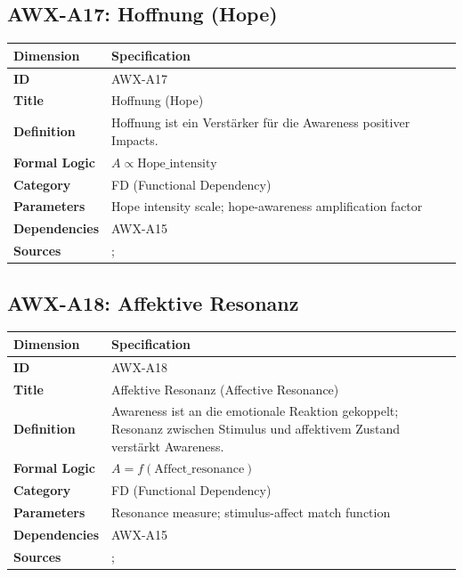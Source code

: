 
\subsection{AWX-A17: Hoffnung (Hope)}

\begin{table}[htbp]
\small
\begin{tabular}{p{3cm}p{11cm}}
\toprule
\textbf{Dimension} & \textbf{Specification} \\
\midrule
\textbf{ID} & AWX-A17 \\
\textbf{Title} & Hoffnung (Hope) \\
\textbf{Definition} & Hoffnung ist ein Verstärker für die Awareness positiver Impacts. \\
\textbf{Formal Logic} & $A \propto \text{Hope\_intensity}$ \\
\textbf{Category} & FD (Functional Dependency) \\
\textbf{Parameters} & Hope intensity scale; hope-awareness amplification factor \\
\textbf{Dependencies} & AWX-A15 \\
\textbf{Sources} & \citet{snyder2002hope}; \citet{rottenstreich2001money} \\
\bottomrule
\end{tabular}
\end{table}


\subsection{AWX-A18: Affektive Resonanz}

\begin{table}[htbp]
\small
\begin{tabular}{p{3cm}p{11cm}}
\toprule
\textbf{Dimension} & \textbf{Specification} \\
\midrule
\textbf{ID} & AWX-A18 \\
\textbf{Title} & Affektive Resonanz (Affective Resonance) \\
\textbf{Definition} & Awareness ist an die emotionale Reaktion gekoppelt; Resonanz zwischen Stimulus und affektivem Zustand verstärkt Awareness. \\
\textbf{Formal Logic} & $A = f(\text{Affect\_resonance})$ \\
\textbf{Category} & FD (Functional Dependency) \\
\textbf{Parameters} & Resonance measure; stimulus-affect match function \\
\textbf{Dependencies} & AWX-A15 \\
\textbf{Sources} & \citet{zajonc1980feeling}; \citet{loewenstein2001risk} \\
\bottomrule
\end{tabular}
\end{table}


